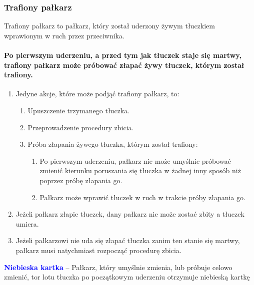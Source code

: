 \documentclass[12pt]{article}
\newcommand\bluecard[1]{\bgroup\textcolor{blue}{\textbf{#1}}}
\begin{document}
\subsubsection{Trafiony pałkarz}

Trafiony pałkarz to pałkarz, który został uderzony żywym tłuczkiem
wprawionym w ruch przez przeciwnika.

\paragraph{Po pierwszym uderzeniu, a przed tym jak tłuczek staje
	się martwy, trafiony pałkarz może próbować złapać żywy tłuczek, którym
	został trafiony.}

\begin{enumerate}
	\item
	      Jedyne akcje, które może podjąć trafiony pałkarz, to:

	      \begin{enumerate}
		      \item
		            Upuszczenie trzymanego tłuczka.
		      \item
		            Przeprowadzenie procedury zbicia.
		      \item
		            Próba złapania żywego tłuczka, którym został trafiony:

		            \begin{enumerate}
			            \item
			                  Po pierwszym uderzeniu, pałkarz nie może umyślnie próbować zmienić
			                  kierunku poruszania się tłuczka w żadnej inny sposób niż poprzez
			                  próbę złapania go.
			            \item
			                  Pałkarz może wprawić tłuczek w ruch w trakcie próby złapania go.
		            \end{enumerate}
	      \end{enumerate}
	\item
	      Jeżeli pałkarz złapie tłuczek, dany pałkarz nie może zostać zbity a
	      tłuczek umiera.
	\item
	      Jeżeli pałkarzowi nie uda się złapać tłuczka zanim ten stanie się
	      martwy, pałkarz musi natychmiast rozpocząć procedurę zbicia.
\end{enumerate}

\bluecard{Niebieska kartka} -- Pałkarz, który umyślnie zmienia, lub próbuje
celowo zmienić, tor lotu tłuczka po początkowym uderzeniu otrzymuje
niebieską kartkę
\end{document}
